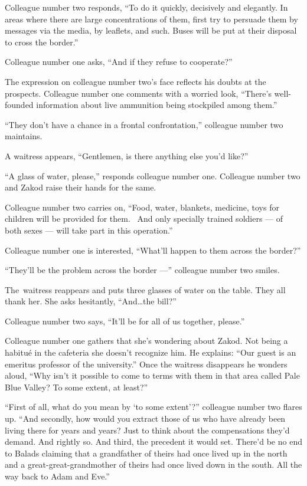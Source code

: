 \documentclass[twoside,11pt]{book}
\begin{document}
Colleague number two responds, ``To do it quickly, decisively and elegantly. In areas where there are large
concentrations of them, first try to persuade them by messages via the media, by leaflets, and such. Buses will be put
at their disposal to cross the border.''

Colleague number one asks, ``And if they refuse to cooperate?''

The expression on colleague number two's face reflects his doubts at the prospects. Colleague number one comments with a
worried look, ``There's well-founded information about live ammunition being stockpiled among
them.''

``They don't have a chance in a frontal confrontation,'' colleague number two maintains.

A waitress appears, ``Gentlemen, is there anything else you'd like?''

``A glass of water, please,'' responds colleague number one. Colleague number two and Zakod
raise their hands for the same.

Colleague number two carries on, ``Food, water, blankets, medicine, toys for children will be provided for
them. ~And only specially trained soldiers --- of both sexes --- will take part in this operation.''

Colleague number one is interested, ``What'll happen to them across the border?''

``They'll be the problem across the border ---'' colleague number two smiles.

The~waitress reappears and puts three glasses of water on the table. They all thank her. She asks hesitantly,
``And{\ldots}the bill?''

Colleague number two says, ``It'll be for all of us together, please.''

Colleague number one gathers that she's wondering about Zakod. Not being a habitu\'e in the cafeteria she doesn't
recognize him. He explains: ``Our guest is an emeritus professor of the university.'' Once
the waitress disappears he wonders aloud, ``Why isn't it possible to come to terms with them in that area
called Pale Blue Valley? To some extent, at least?''

``First of all, what do you mean by `to some extent'?'' colleague number two flares up.
``And secondly, how would you extract those of us who have already been living there for years and years?
Just to think about the compensations they'd demand. And rightly so. And third, the precedent it would set. There'd be
no end to Balads claiming that a grandfather of theirs had once lived up in the north and a great-great-grandmother of
theirs had once lived down in the south. All the way back to Adam and Eve.''
\end{document}
